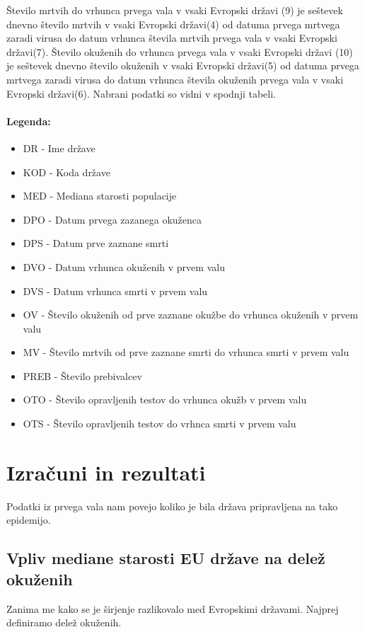 \documentclass[a4paper,11pt]{article}
\begin{document}
Število mrtvih do vrhunca prvega vala v vsaki Evropski državi (9) je seštevek dnevno število mrtvih v vsaki Evropski državi(4) od datuma prvega mrtvega zaradi virusa do datum vrhunca števila mrtvih prvega vala v vsaki Evropski državi(7).
Število okuženih do vrhunca prvega vala v vsaki Evropski državi (10) je seštevek dnevno število okuženih v vsaki Evropski državi(5) od datuma prvega mrtvega zaradi virusa do datum vrhunca števila okuženih prvega vala v vsaki Evropski državi(6). Nabrani podatki so vidni v spodnji tabeli.\\
\paragraph{Legenda:}

\begin{itemize}
\item{DR - Ime države}
\item{KOD - Koda države}
\item{MED - Mediana starosti populacije}
\item{DPO - Datum prvega zazanega okuženca}
\item{DPS - Datum prve zaznane smrti}
\item{DVO - Datum vrhunca okuženih v prvem valu}
\item{DVS - Datum vrhunca smrti v prvem valu}
\item{OV - Število okuženih od prve zaznane okužbe do vrhunca okuženih v prvem valu}
\item{MV - Število mrtvih od prve zaznane smrti do vrhunca smrti v prvem valu}
\item{PREB - Število prebivalcev}
\item{OTO - Število opravljenih testov do vrhunca okužb v prvem valu}
\item{OTS - Število opravljenih testov do vrhnca smrti v prvem valu}
\end{itemize}

\section{Izračuni in rezultati}
Podatki iz prvega vala nam povejo koliko je bila država pripravljena na tako epidemijo.


\subsection{Vpliv mediane starosti EU države na delež okuženih}
Zanima me kako se je širjenje razlikovalo med Evropskimi državami. Najprej definiramo delež okuženih.
\end{document}
